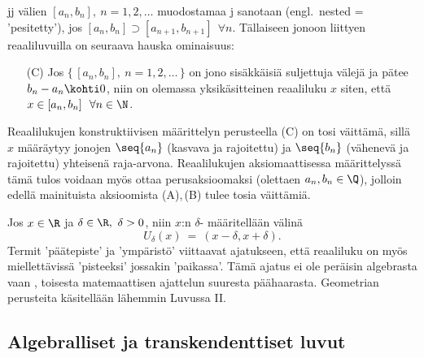 jj välien $[a_n, b_n],\ n =1,2, \ldots$ muodostamaa j
sanotaan  (engl.\ nested = 'pesitetty'), jos 
$[a_n, b_n] \supset [a_{n+1}, b_{n+1}]\ \ \forall n$. Tällaiseen jonoon liittyen reaaliluvuilla 
on seuraava hauska ominaisuus:
\begin{itemize}
\item[(C)] Jos $\{\,[a_n, b_n],\ n = 1,2, \ldots\,\}$ on jono sisäkkäisiä suljettuja välejä ja
           pätee $b_n - a_n \kohti 0$, niin on olemassa yksikäsitteinen reaaliluku $x$ siten, 
           että $x \in [a_n, b_n]\ \ \forall n \in \N$.
\end{itemize}
Reaalilukujen konstruktiivisen määrittelyn perusteella (C) on tosi väittämä, sillä $x$ määräytyy
jonojen $\seq{a_n}$ (kasvava ja rajoitettu) ja $\seq{b_n}$ (vähenevä ja rajoitettu) yhteisenä 
raja-arvona. Reaalilukujen aksiomaattisessa määrittelyssä tämä tulos voidaan myös ottaa 
perusaksioomaksi (olettaen $a_n,b_n\in\Q$), jolloin edellä mainituista aksioomista (A),\,(B) 
tulee tosia väittämiä.

Jos $x \in \R$ ja $\delta\in\R,\ \delta > 0$, niin $x$:n 
%
$\delta$- määritellään  välinä
\[
U_{\delta}(x)\ =\ (x-\delta,x+\delta).
\]
Termit 'päätepiste' ja 'ympäristö' viittaavat ajatukseen, että reaaliluku on myös miellettävissä
'pisteeksi' jossakin 'paikassa'. Tämä ajatus ei ole peräisin algebrasta vaan ,
toisesta matemaattisen ajattelun suuresta päähaarasta. Geometrian perusteita käsitellään 
lähemmin Luvussa II.

\subsection{Algebralliset ja transkendenttiset luvut}

